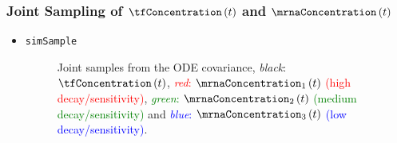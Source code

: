 \begin{frame}
  \frametitle{Joint Sampling of $\tfConcentration\left(t\right)$ and $\mrnaConcentration\left(t\right)$ }
  \begin{itemize}
  \item {\texttt{simSample}}%
    \begin{figure}
            
      
      \caption{{\small Joint samples from the ODE covariance, 
          \emph{black}: $\tfConcentration\left(t\right)$, 
          \textcolor{red}{\emph{red}: $\mrnaConcentration_{1}\left(t\right)$ (high decay/sensitivity)},
          \textcolor{green}{\emph{green}: $\mrnaConcentration_{2}\left(t\right)$ (medium decay/sensitivity)} and 
          \textcolor{blue}{\emph{blue}: $\mrnaConcentration_{3}\left(t\right)$ (low decay/sensitivity)}.}}
      
    \end{figure}
  \end{itemize}
\end{frame}
